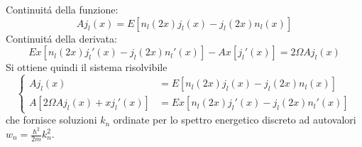 \documentclass[a4paper]{article}
\begin{document}
        Continuit\'a della funzione:
        \begin{equation*}
            Aj_l(x)=E\left[n_l(2x)j_l(x)-j_l(2x)n_l(x)\right]
        \end{equation*}
        Continuit\'a della derivata:
        \begin{equation*}
            Ex\left[n_l(2x)j_l'(x)-j_l(2x)n_l'(x)\right]-Ax\left[j_l'(x)\right]=2\Omega Aj_l(x)
        \end{equation*}
        Si ottiene quindi il sistema risolvibile
        \begin{equation*}
            \begin{cases}
                Aj_l(x)&=E\left[n_l(2x)j_l(x)-j_l(2x)n_l(x)\right]\\
                A\left[2\Omega Aj_l(x)+xj_l'(x)\right]&=Ex\left[n_l(2x)j_l'(x)-j_l(2x)n_l'(x)\right]
            \end{cases}
        \end{equation*}
        che fornisce soluzioni $k_n$ ordinate per lo spettro energetico discreto ad autovalori $w_n=\frac{\hbar^2}{2m}k_n^2$.



    
\end{document}
